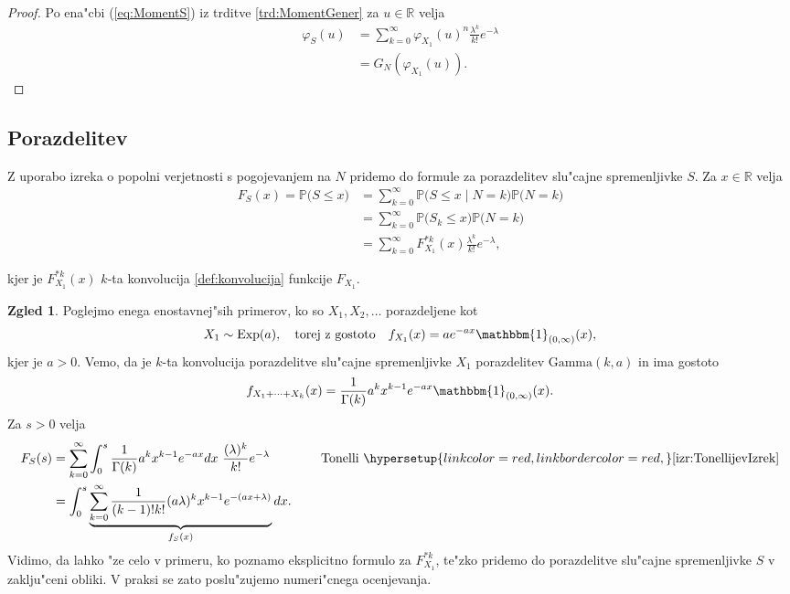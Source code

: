 \documentclass[12pt, a4paper, reqno]{amsart}
\theoremstyle{definition}
\newtheorem{zgled}[definicija]{Zgled}
\theoremstyle{plain}
\newcommand{\R}{\mathbb{R}}
\newcommand{\Prob}{\mathbb{P}}
\newcommand{\1}{\mathds{1}}
\newcommand*{\refPriloga}[1]{%
  \begingroup
    \hypersetup{
      linkcolor=red,
      linkbordercolor=red,
    }%
    \ref{#1}%
  \endgroup
}
\begin{document}
    \begin{proof}
        Po ena"cbi (\ref{eq:MomentS}) iz trditve \ref{trd:MomentGener} za $u\in\R$ velja
        \begin{align*}
            \varphi_{S}(u) &= \sum_{k=0}^{\infty}
            \varphi_{X_1}(u)^n\frac{\lambda^k}{k!}e^{-\lambda} \\
            &= G_{N}\left(\varphi_{X_1}(u)\right).
        \end{align*}
    \end{proof}

    \subsection{Porazdelitev}
    Z uporabo izreka o popolni verjetnosti s pogojevanjem na $N$ pridemo do formule za 
    porazdelitev slu"cajne spremenljivke $S$. Za $x \in \R$ velja 
    \begin{align*}
        F_{S}(x) = \Prob\bigl(S \leq x\bigr) 
        &= \sum_{k=0}^\infty \Prob\bigl(S \leq x \mid N = k\bigr)\Prob\bigl(N = k\bigr) \\
        &= \sum_{k=0}^\infty \Prob\bigl(S_k \leq x\bigr)\Prob\bigl(N = k\bigr) \\
        &= \sum_{k=0}^\infty F_{X_1}^{*k}(x) \frac{\lambda^k}{k!} e^{-\lambda},
    \end{align*}

    \noindent
    kjer je $F_{X_1}^{*k}(x)$  $k$-ta konvolucija \refPriloga{def:konvolucija} funkcije $F_{X_1}$.
    
    \begin{zgled}
        Poglejmo enega enostavnej"sih primerov, ko so $X_1, X_2, \dots$ porazdeljene kot
        \begin{equation*}
            X_1\sim\text{Exp}(a),\quad \text{torej z gostoto} \quad  f_{X_1}(x) = a e^{-a x}\mathbbm{1}_{(0, \infty)}(x),
        \end{equation*}
        kjer je $a>0$. Vemo, da je $k$-ta 
        konvolucija porazdelitve slu"cajne spremenljivke $X_1$ porazdelitev
         $\text{Gamma}(k, a)$ in ima gostoto
        \begin{equation*}
            f_{X_1 + \cdots + X_k}(x) = \frac{1}{\Gamma(k)}a^kx^{k-1}e^{-a x}\mathbbm{1}_{(0, \infty)}(x).
        \end{equation*}
        Za $s>0$ velja
        \begin{align*}
            F_{S}(s) 
            &= \sum_{k=0}^\infty \int_0^s\frac{1}{\Gamma(k)}a^kx^{k-1}e^{-ax}dx \ \frac{(\lambda )^k}{k!}e^{-\lambda }
            \qquad \qquad \text{Tonelli} \ \refPriloga{izr:TonellijevIzrek} \\
            &= \int_0^s\underbrace{\sum_{k=0}^\infty \frac{1}{(k-1)!k!}(a\lambda)^kx^{k-1}e^{-(ax + \lambda)}}_{f_S(x)}dx.
        \end{align*}
        Vidimo, da lahko "ze celo v primeru, ko poznamo eksplicitno formulo za $F^{*k}_{X_1}$, te"zko pridemo do 
        porazdelitve slu"cajne spremenljivke $S$ v zaklju"ceni obliki. V praksi se zato poslu"zujemo numeri"cnega 
        ocenjevanja.
        \label{zgd:sestavljenaPoissonovaPorazdelitevGamma}
    \end{zgled}
\end{document}
